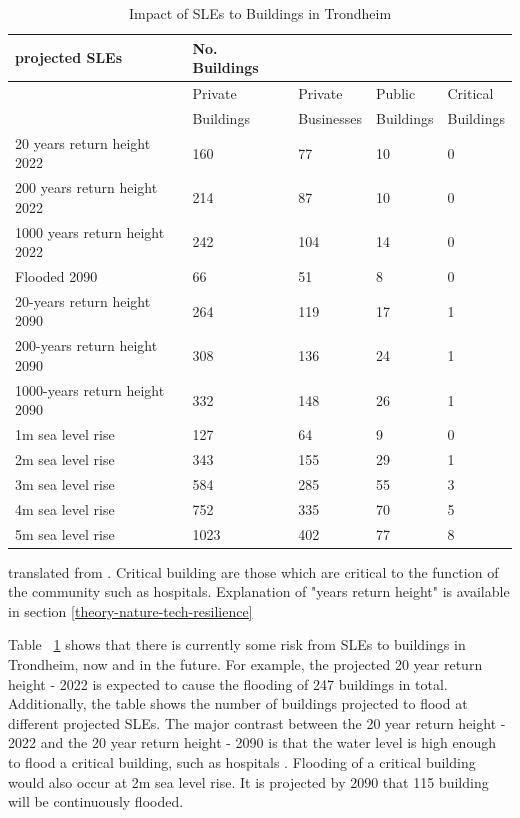 \begin{table}[H]
    \centering
    \begin{tabular}{|l|l|l|l|l|}
    \hline
        \textbf{projected SLEs }& \textbf{No. Buildings}  & ~ & ~ & ~ \\ \hline
        ~ & Private & Private & Public  & Critical  \\ \newline
        ~ & Buildings & Businesses & Buildings & Buildings \\ \hline        
        20 years return height 2022 & 160 & 77 & 10 & 0 \\ \hline
        200 years return height 2022 & 214 & 87 & 10 & 0 \\ \hline
        1000 years return height 2022 & 242 & 104 & 14 & 0 \\ \hline
        Flooded 2090 & 66 & 51 & 8 & 0 \\ \hline
        20-years return height 2090 & 264 & 119 & 17 & 1 \\ \hline
        200-years return height  2090 & 308 & 136 & 24 & 1 \\ \hline
        1000-years return height  2090 & 332 & 148 & 26 & 1 \\ \hline
        1m sea level rise & 127 & 64 & 9 & 0 \\ \hline
        2m sea level rise & 343 & 155 & 29 & 1 \\ \hline
        3m sea level rise & 584 & 285 & 55 & 3 \\ \hline
        4m sea level rise & 752 & 335 & 70 & 5 \\ \hline
        5m sea level rise & 1023 & 402 & 77 & 8 \\ \hline
    \end{tabular}
    \caption{Impact of SLEs to Buildings in Trondheim }{translated from \cite{kartverket_se_2021}. Critical building are those which are critical to the function of the community such as hospitals. Explanation of "years return height" is available in section \ref{theory-nature-tech-resilience} }
    \label{table:building-impact-sle}
\end{table}


Table ~\ref{table:building-impact-sle} shows that there is currently some risk from SLEs to buildings in Trondheim, now and in the future. For example, the projected 20 year return height - 2022 is expected to cause the flooding of 247 buildings in total. Additionally, the table shows the number of buildings projected to flood at different projected SLEs. The major contrast between the 20 year return height - 2022 and the 20 year return height - 2090 is that the water level is high enough to flood a critical building, such as hospitals . Flooding of a critical building would also occur at 2m sea level rise. It is projected by 2090 that 115 building will be continuously flooded.
